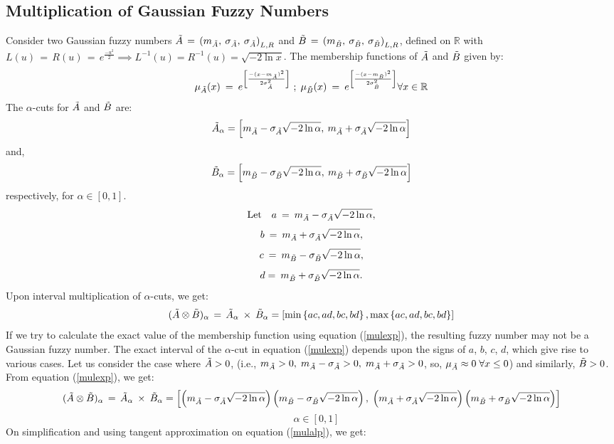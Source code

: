 \documentclass{article}
\begin{document}
\subsection{Multiplication of Gaussian Fuzzy Numbers}
Consider two Gaussian fuzzy numbers $\Tilde{A} \,=\, \left(m_{\Tilde{A}},\: \sigma_{\Tilde{A}}, \:\sigma_{\Tilde{A}}\right)_{L,R}$ and $\Tilde{B}\,=\, \left(m_{\Tilde{B}},\: \sigma_{\Tilde{B}}, \:\sigma_{\Tilde{B}}\right)_{L,R}$, defined on $\mathbb{R}$ with $L(u) \,=\, R(u)\,=\,e^{\frac{-u^2}{2}}\implies L^{-1}(u) = R^{-1} (u) = \sqrt{-2\ln{x}}$. The membership functions of $\Tilde{A}$ and $\Tilde{B}$ given by:
\[ \mu_{\Tilde{A}}(x) \:=\:e^{\left[ \frac{-(x-m_{\Tilde{A}})^2}{2\sigma_{\Tilde{A}}^{2}} \right]}\;  ; \;\mu_{\Tilde{B}}(x) \: = \:e^{\left[ \frac{-(x-m_{\Tilde{B}})^2}{2\sigma_{\Tilde{B}}^{2}} \right]} \forall x\in \mathbb{R} \] 
The $\alpha$-cuts for $\Tilde{A}$ and $\Tilde{B}$ are: \[ \Tilde{A}_{\alpha} = \left[m_{\Tilde{A}}-\sigma_{\Tilde{A}}\sqrt{-2\ln{\alpha}}, \: m_{\Tilde{A}}+\sigma_{\Tilde{A}}\sqrt{-2\ln{\alpha}} \right]\] and, \[ \Tilde{B}_{\alpha} = \left[m_{\Tilde{B}}-\sigma_{\Tilde{B}}\sqrt{-2\ln{\alpha}}, \: m_{\Tilde{B}}+\sigma_{\Tilde{B}}\sqrt{-2\ln{\alpha}} \right]\] respectively, for $\alpha\in[0,1]$.
\[
\text{Let}\quad a\: = \:m_{\Tilde{A}}-\sigma_{\Tilde{A}}\sqrt{-2\ln{\alpha}},\] 
\[b \: =  \: m_{\Tilde{A}}+\sigma_{\Tilde{A}}\sqrt{-2\ln{\alpha}},\]
\[c \: =\: m_{\Tilde{B}}-\sigma_{\Tilde{B}}\sqrt{-2\ln{\alpha}}, \]
\[d = \: m_{\Tilde{B}}+\sigma_{\Tilde{B}}\sqrt{-2\ln{\alpha}}.
\]\newline Upon interval multiplication of $\alpha$-cuts, we get:
\begin{equation}\label{mulexp}
 (\Tilde{A}\otimes\Tilde{B})_\alpha\,=\,\Tilde{A}_\alpha \: \times \: \Tilde{B}_\alpha = \left[ \text{min}\left\{ac, ad, bc, bd \right\}, \text{max}\left\{ac, ad, bc, bd \right\} \right]  
\end{equation}\newline If we try to calculate the exact value of the membership function using equation (\ref{mulexp}), the resulting fuzzy number may not be a Gaussian fuzzy number. The exact interval of the $\alpha$-cut in equation (\ref{mulexp}) depends upon the signs of $a$, $b$, $c$, $d$, which give rise to various cases. Let us consider the case where $\Tilde{A} > 0$, (i.e., $m_{\Tilde{A}} > 0,\; m_{\Tilde{A}} - \sigma_{\Tilde{A}} >0,\; m_{\Tilde{A}} + \sigma_{\Tilde{A}} > 0$, so, $\mu_{\Tilde{A}}\approx0\; \forall x\leq0$) and similarly, $\Tilde{B} > 0$. From equation (\ref{mulexp}), we get:
\begin{equation}\label{mulalp}
(\Tilde{A}\otimes\Tilde{B})_\alpha\,=\,\Tilde{A}_\alpha \: \times \: \Tilde{B}_\alpha = \left[ 
\left(m_{\Tilde{A}}-\sigma_{\Tilde{A}}\sqrt{-2\ln{\alpha}}\right)\left(m_{\Tilde{B}}-\sigma_{\Tilde{B}}\sqrt{-2\ln{\alpha}}\right), \; \left( m_{\Tilde{A}}+\sigma_{\Tilde{A}}\sqrt{-2\ln{\alpha}}\right)\left(m_{\Tilde{B}}+\sigma_{\Tilde{B}}\sqrt{-2\ln{\alpha}}\right)\right]\end{equation}\[\quad\alpha\in [0,1]\]\newline On simplification and using tangent approximation on equation (\ref{mulalp}), we get:
\end{document}
